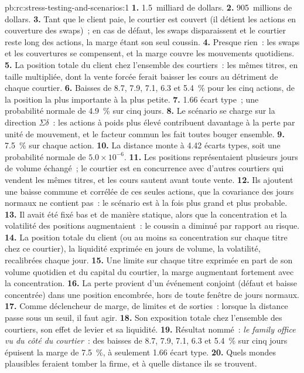 \begin{solution}{pb:rc:stress-testing-and-scenarios:1}
\textbf{1.} 1.5~milliard de dollars.
\textbf{2.} 905~millions de dollars.
\textbf{3.} Tant que le client paie, le courtier est couvert (il détient les actions en couverture des swaps)~; en cas de défaut,
les swaps disparaissent et le courtier reste long des actions, la marge étant son seul coussin.
\textbf{4.} Presque rien~: les swaps et les couvertures se compensent, et la marge couvre les mouvements quotidiens.
\textbf{5.} La position totale du client chez l'ensemble des courtiers~: les mêmes titres, en taille multipliée,
dont la vente forcée ferait baisser les cours au détriment de chaque courtier.
\textbf{6.} Baisses de 8.7, 7.9, 7.1, 6.3 et 5.4~\% pour les cinq actions, de la position la plus importante à la
plus petite.
\textbf{7.} 1.66 écart type~; une probabilité normale de 4.9~\% sur cinq jours.
\textbf{8.} Le scénario se charge sur la direction $\Sigma\delta$~: les actions à poids plus élevé contribuent davantage à
la perte par unité de mouvement, et le facteur commun les fait toutes bouger ensemble.
\textbf{9.} 7.5~\% sur chaque action.
\textbf{10.} La distance monte à 4.42 écarts types, soit une probabilité normale de $5.0\times10^{-6}$.
\textbf{11.} Les positions représentaient plusieurs jours de volume échangé~; le courtier est en concurrence avec d'autres courtiers
qui vendent les mêmes titres, et les cours sautent avant toute vente.
\textbf{12.} Ils ajoutent une baisse commune et corrélée de ces seules actions, que la covariance des jours normaux ne contient pas~:
le scénario est à la fois plus grand et plus probable.
\textbf{13.} Il avait été fixé bas et de manière statique, alors que la concentration et la volatilité des positions augmentaient~:
le coussin a diminué par rapport au risque.
\textbf{14.} La position totale du client (ou au moins sa concentration sur chaque titre chez ce courtier),
la liquidité exprimée en jours de volume, la volatilité, recalibrées chaque jour.
\textbf{15.} Une limite sur chaque titre exprimée en part de son volume quotidien et du capital du courtier,
la marge augmentant fortement avec la concentration.
\textbf{16.} La perte provient d'un événement conjoint (défaut et baisse concentrée) dans une position encombrée,
hors de toute fenêtre de jours normaux.
\textbf{17.} Comme déclencheur de marge, de limites et de sorties~: lorsque la distance passe sous un seuil, il faut agir.
\textbf{18.} Son exposition totale chez l'ensemble des courtiers, son effet de levier et sa liquidité.
\textbf{19.} Résultat nommé~: \emph{le family office vu du côté du courtier}~: des baisses de 8.7, 7.9, 7.1, 6.3 et
5.4~\% sur cinq jours épuisent la marge de 7.5~\%, à seulement 1.66 écart type.
\textbf{20.} Quels mondes plausibles feraient tomber la firme, et à quelle distance ils se trouvent.
\end{solution}


